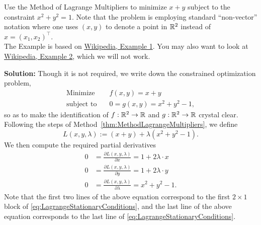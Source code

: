 \begin{example} 
\label{ex:lagrangeMultiplierExample01}
Use the Method of Lagrange Multipliers to minimize \( x+y \) subject to the constraint \( x^2 + y^2 = 1 \).  Note that the problem is employing standard ``non-vector'' notation where one uses $(x, y)$ to denote a point in $\mathbb R^2$ instead of $x = (x_1, x_2)^\top$.  \\

The Example is based on \href{https://en.wikipedia.org/wiki/Lagrange_multiplier#:~:text=%5Bedit%5D-,Example%201,-%5Bedit%5D}{Wikipedia, Example 1}. You may also want to look at \href{https://en.wikipedia.org/wiki/Lagrange_multiplier#:~:text=%5Bedit%5D-,Example%201,-%5Bedit%5D}{Wikipedia, Example 2}, which we will not work.
\end{example}

\textbf{Solution:} Though it is not required, we write down the constrained optimization problem,
\begin{align*}
\text{Minimize} \quad & f(x,y)=x+y\\
\text{subject to} \quad & 0 = g(x,y) = x^2 + y^2 -1,
\end{align*}
so as to make the identification of $f:\mathbb R^2 \to \mathbb R$ and $g:\mathbb R^2 \to \mathbb R$ crystal clear. Following the steps of Method~\ref{thm:MethodLagrangeMultipliers}, we define
$$L(x,y, \lambda):=(x + y) + \lambda \left(x^2 + y^2 -1\right).$$
We then compute the required partial derivatives
\begin{equation}
\label{eq:LagrangeStationaryConditionsExample1}
\begin{aligned}
0 &= \frac{ \partial L(x, y, \lambda)}{\partial x} = 1 + 2  \lambda \cdot x \\
0 &= \frac{ \partial L(x, y, \lambda)}{\partial y} = 1 + 2 \lambda \cdot y \\
0 &= \frac{ \partial L(x, y, \lambda)}{\partial \lambda} = x^2 + y^2 -1.    
\end{aligned}
\end{equation}
Note that the first two lines of the above equation correspond to the first $2 \times 1$ block of \eqref{eq:LagrangeStationaryConditions}, and the last line of the above equation corresponds to the last line of \eqref{eq:LagrangeStationaryConditions}. \\

